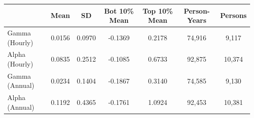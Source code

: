 \begin{tabular}{lcccccc}
\hline\hline
 & Mean & SD & Bot 10\% Mean & Top 10\% Mean & Person-Years & Persons \\
\hline
Gamma (Hourly)&0.0156&0.0970&-0.1369&0.2178&74,916&9,117\\
Alpha (Hourly)&0.0835&0.2512&-0.1085&0.6733&92,875&10,374\\
Gamma (Annual)&0.0234&0.1404&-0.1867&0.3140&74,585&9,130\\
Alpha (Annual)&0.1192&0.4365&-0.1761&1.0924&92,453&10,381\\
\hline\hline
\end{tabular}
